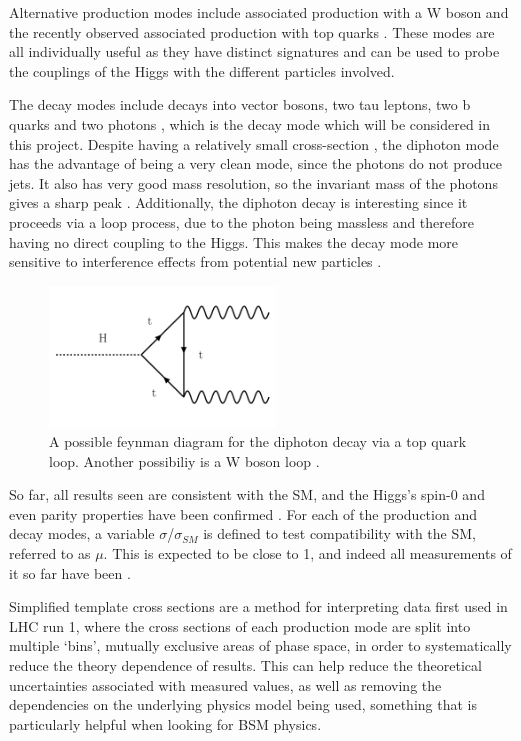 \documentclass[12pt]{article}
\begin{document}
Alternative production modes include associated production with a W boson and the recently observed associated production with top quarks \cite{tth}. These modes are all individually useful as they have distinct signatures and can be used to probe the couplings of the Higgs with the different particles involved. 

The decay modes include decays into vector bosons, two tau leptons, two b quarks and two photons \cite{gluinotheory1}, which is the decay mode which will be considered in this project. Despite having a relatively small cross-section \cite{cmsannouncement}, the diphoton mode has the advantage of being a very clean mode, since the photons do not produce jets. It also has very good mass resolution, so the invariant mass of the photons gives a sharp peak \cite{seezdiphoton}. Additionally, the diphoton decay is interesting since it proceeds via a loop process, due to the photon being massless and therefore having no direct coupling to the Higgs. This makes the decay mode more sensitive to interference effects from potential new particles \cite{cmsanalysis1}. 

\begin{figure}[H]
\centering
\includegraphics[width=6cm]{decay.png}
\caption{A possible feynman diagram for the diphoton decay via a top quark loop. Another possibiliy is a W boson loop \cite{feynmanmaker}.}
	\label{decay}
\end{figure}

So far, all results seen are consistent with the SM, and the Higgs's spin-0 and even parity properties have been confirmed \cite{cmsupdate2} \cite{parity2}. For each of the production and decay modes, a variable $\sigma$/$\sigma_{SM}$ is defined to test compatibility with the SM, referred to as $\mu$. This is expected to be close to 1, and indeed all measurements of it so far have been \cite{atlasann}\cite{cmsupdate2}.

Simplified template cross sections are a method for interpreting data first used in LHC run 1, where the cross sections of each production mode are split into multiple `bins', mutually exclusive areas of phase space, in order to systematically reduce the theory dependence of results. This can help reduce the theoretical uncertainties associated with measured values, as well as removing the dependencies on the underlying physics model being used, something that is particularly helpful when looking for BSM physics. 
\end{document}
